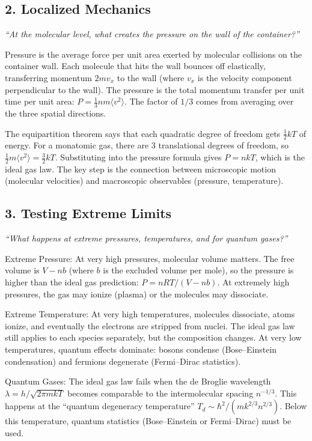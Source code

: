 \subsection*{2. Localized Mechanics}
\textit{``At the molecular level, what creates the pressure on the wall of the container?''}

Pressure is the average force per unit area exerted by molecular collisions on the container wall. Each molecule that hits the wall bounces off elastically, transferring momentum $2mv_x$ to the wall (where $v_x$ is the velocity component perpendicular to the wall). The pressure is the total momentum transfer per unit time per unit area: $P = \frac{1}{3}nm\langle v^2\rangle$. The factor of $1/3$ comes from averaging over the three spatial directions.

The equipartition theorem says that each quadratic degree of freedom gets $\frac{1}{2}kT$ of energy. For a monatomic gas, there are 3 translational degrees of freedom, so $\frac{1}{2}m\langle v^2\rangle = \frac{3}{2}kT$. Substituting into the pressure formula gives $P = nkT$, which is the ideal gas law. The key step is the connection between microscopic motion (molecular velocities) and macroscopic observables (pressure, temperature).

\subsection*{3. Testing Extreme Limits}
\textit{``What happens at extreme pressures, temperatures, and for quantum gases?''}

Extreme Pressure: At very high pressures, molecular volume matters. The free volume is $V - nb$ (where $b$ is the excluded volume per mole), so the pressure is higher than the ideal gas prediction: $P = nRT/(V - nb)$. At extremely high pressures, the gas may ionize (plasma) or the molecules may dissociate.

Extreme Temperature: At very high temperatures, molecules dissociate, atoms ionize, and eventually the electrons are stripped from nuclei. The ideal gas law still applies to each species separately, but the composition changes. At very low temperatures, quantum effects dominate: bosons condense (Bose--Einstein condensation) and fermions degenerate (Fermi--Dirac statistics).

Quantum Gases: The ideal gas law fails when the de Broglie wavelength $\lambda = h/\sqrt{2\pi mkT}$ becomes comparable to the intermolecular spacing $n^{-1/3}$. This happens at the ``quantum degeneracy temperature'' $T_d \sim \hbar^2/(mk^{2/3}n^{2/3})$. Below this temperature, quantum statistics (Bose--Einstein or Fermi--Dirac) must be used.

